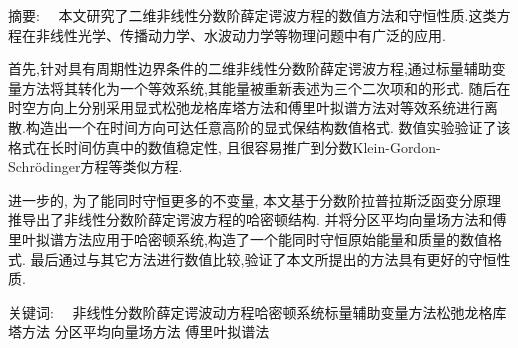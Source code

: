 
\begin{ChineseAbstract}[副教授]%
\item {\heiti 摘要:\ \ }
本文研究了二维非线性分数阶薛定谔波方程的数值方法和守恒性质.这类方程在非线性光学、传播动力学、水波动力学等物理问题中有广泛的应用.

首先,针对具有周期性边界条件的二维非线性分数阶薛定谔波方程,通过标量辅助变量方法将其转化为一个等效系统,其能量被重新表述为三个二次项和的形式.
随后在时空方向上分别采用显式松弛龙格库塔方法和傅里叶拟谱方法对等效系统进行离散.构造出一个在时间方向可达任意高阶的显式保结构数值格式.
数值实验验证了该格式在长时间仿真中的数值稳定性, 且很容易推广到分数Klein-Gordon-Schr{\"o}dinger方程等类似方程.

进一步的, 为了能同时守恒更多的不变量, 本文基于分数阶拉普拉斯泛函变分原理推导出了非线性分数阶薛定谔波方程的哈密顿结构.
并将分区平均向量场方法和傅里叶拟谱方法应用于哈密顿系统,构造了一个能同时守恒原始能量和质量的数值格式.
最后通过与其它方法进行数值比较,验证了本文所提出的方法具有更好的守恒性质.

\item {\heiti 关键词:\ \ } 非线性分数阶薛定谔波动方程\qquad 哈密顿系统\qquad 标量辅助变量方法\qquad 松弛龙格库塔方法 \qquad 分区平均向量场方法 \qquad 傅里叶拟谱法
\end{ChineseAbstract}
